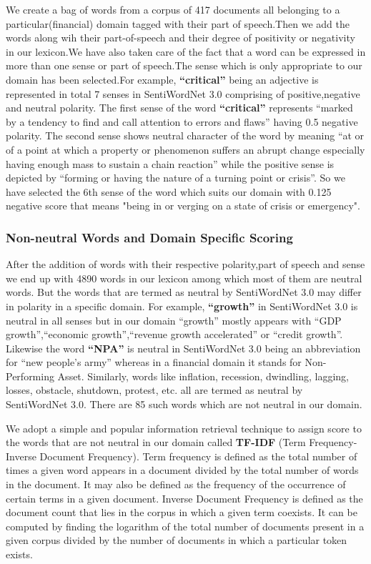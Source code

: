 \documentclass[a4paper, 10pt, conference]{ieeeconf}      %
\begin{document}
We create a bag of words from a corpus of 417 documents all belonging to a particular(financial) domain tagged with their part of speech.Then we add the words along wih their part-of-speech and their degree of positivity or negativity in our lexicon.We have also taken care of the fact that a word can be expressed in more than one sense or part of speech.The sense which is only appropriate to our domain has been selected.For example, \textbf{``critical''} being an adjective is represented in total 7 senses in SentiWordNet 3.0 comprising of positive,negative and neutral polarity. The first sense of the word \textbf{``critical''} represents ``marked by a tendency to find and call attention to errors and flaws'' having 0.5 negative polarity. The second sense shows neutral character of the word by meaning ``at or of a point at which a property or phenomenon suffers an abrupt change especially having enough mass to sustain a chain reaction'' while the positive sense is depicted by ``forming or having the nature of a turning point or crisis''. So we have selected the 6th sense of the word which suits our domain with 0.125 negative score that means "being in or verging on a state of crisis or emergency".

\subsubsection{Non-neutral Words and Domain Specific Scoring}
After the addition of words with their respective polarity,part of speech and sense we end up with 4890 words in our lexicon among which most of them are neutral words. But the words that are termed as neutral by SentiWordNet 3.0 may differ in polarity in a specific domain. For example, \textbf{``growth''} in SentiWordNet 3.0 is neutral in all senses but in our domain ``growth'' mostly appears with ``GDP growth'',``economic growth'',``revenue growth accelerated'' or ``credit growth''. Likewise the word \textbf{``NPA''} is neutral in SentiWordNet 3.0 being an abbreviation for ``new people's army'' whereas in a financial domain it stands for Non-Performing Asset. Similarly, words like inflation, recession, dwindling, lagging, losses, obstacle, shutdown, protest, etc. all are termed as neutral by SentiWordNet 3.0. There are 85 such words which are not neutral in our domain.

We adopt a simple and popular information retrieval technique to assign score to the words that are not neutral in our domain called \textbf{TF-IDF} (Term Frequency-Inverse
Document Frequency)\cite{c7}. Term frequency is defined as the total number of times a given word appears
in a document divided by the total number of words in the document. It may also be defined as the
frequency of the occurrence of certain terms in a given document. Inverse Document Frequency is defined as the
document count that lies in the corpus in which a given term coexists.
It can be computed by finding the logarithm of the total number of documents
present in a given corpus divided by the number of documents in which a particular
token exists.
\end{document}
